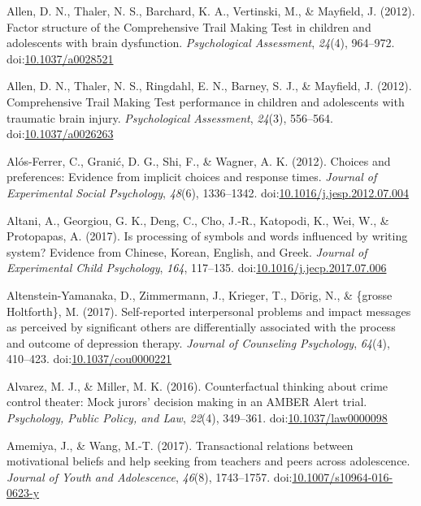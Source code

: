 \documentclass[english,man]{apa6}
\theoremstyle{definition}
\theoremstyle{definition}
\theoremstyle{definition}
\theoremstyle{remark}
\begin{document}
\hypertarget{ref-Allen2012a}{}
Allen, D. N., Thaler, N. S., Barchard, K. A., Vertinski, M., \&
Mayfield, J. (2012). Factor structure of the Comprehensive Trail Making
Test in children and adolescents with brain dysfunction.
\emph{Psychological Assessment}, \emph{24}(4), 964--972.
doi:\href{https://doi.org/10.1037/a0028521}{10.1037/a0028521}

\hypertarget{ref-Allen2012}{}
Allen, D. N., Thaler, N. S., Ringdahl, E. N., Barney, S. J., \&
Mayfield, J. (2012). Comprehensive Trail Making Test performance in
children and adolescents with traumatic brain injury.
\emph{Psychological Assessment}, \emph{24}(3), 556--564.
doi:\href{https://doi.org/10.1037/a0026263}{10.1037/a0026263}

\hypertarget{ref-Alos-Ferrer2012}{}
Alós-Ferrer, C., Granić, D. G., Shi, F., \& Wagner, A. K. (2012).
Choices and preferences: Evidence from implicit choices and response
times. \emph{Journal of Experimental Social Psychology}, \emph{48}(6),
1336--1342.
doi:\href{https://doi.org/10.1016/j.jesp.2012.07.004}{10.1016/j.jesp.2012.07.004}

\hypertarget{ref-Altani2017}{}
Altani, A., Georgiou, G. K., Deng, C., Cho, J.-R., Katopodi, K., Wei,
W., \& Protopapas, A. (2017). Is processing of symbols and words
influenced by writing system? Evidence from Chinese, Korean, English,
and Greek. \emph{Journal of Experimental Child Psychology}, \emph{164},
117--135.
doi:\href{https://doi.org/10.1016/j.jecp.2017.07.006}{10.1016/j.jecp.2017.07.006}

\hypertarget{ref-Altenstein-Yamanaka2017}{}
Altenstein-Yamanaka, D., Zimmermann, J., Krieger, T., Dörig, N., \&
\{grosse Holtforth\}, M. (2017). Self-reported interpersonal problems
and impact messages as perceived by significant others are
differentially associated with the process and outcome of depression
therapy. \emph{Journal of Counseling Psychology}, \emph{64}(4),
410--423.
doi:\href{https://doi.org/10.1037/cou0000221}{10.1037/cou0000221}

\hypertarget{ref-Alvarez2016}{}
Alvarez, M. J., \& Miller, M. K. (2016). Counterfactual thinking about
crime control theater: Mock jurors' decision making in an AMBER Alert
trial. \emph{Psychology, Public Policy, and Law}, \emph{22}(4),
349--361.
doi:\href{https://doi.org/10.1037/law0000098}{10.1037/law0000098}

\hypertarget{ref-Amemiya2017}{}
Amemiya, J., \& Wang, M.-T. (2017). Transactional relations between
motivational beliefs and help seeking from teachers and peers across
adolescence. \emph{Journal of Youth and Adolescence}, \emph{46}(8),
1743--1757.
doi:\href{https://doi.org/10.1007/s10964-016-0623-y}{10.1007/s10964-016-0623-y}
\end{document}
